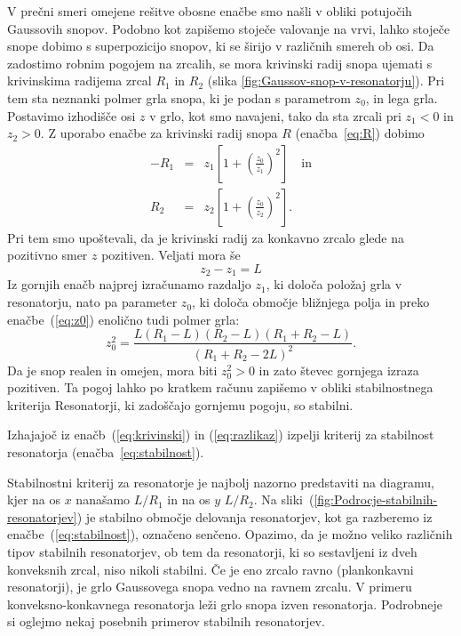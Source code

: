 V prečni smeri omejene rešitve obosne enačbe smo našli v obliki potujočih
Gaussovih snopov. Podobno kot zapišemo stoječe valovanje na vrvi, 
lahko stoječe snope dobimo s superpozicijo snopov, ki se širijo v različnih smereh ob osi. 
Da zadostimo robnim pogojem na zrcalih, se mora krivinski radij snopa ujemati s
krivinskima radijema zrcal $R_{1}$ in $R_{2}$ (slika \ref{fig:Gaussov-snop-v-resonatorju}).
Pri tem sta neznanki polmer grla snopa, ki je podan s parametrom $z_{0}$,
in lega grla. Postavimo izhodišče osi $z$ v grlo, kot smo
navajeni, tako da sta zrcali pri $z_{1}<0$ in $z_{2}>0$. Z uporabo enačbe
za krivinski radij snopa $R$ (enačba~\ref{eq:R}) dobimo 
\begin{eqnarray}
-R_{1} & = & z_{1}\left[1+\left(\frac{z_{0}}{z_{1}}\right)^{2}\right] \quad \textrm{in}\\
R_{2} & = & z_{2}\left[1+\left(\frac{z_{0}}{z_{2}}\right)^{2}\right].
\label{eq:krivinski}
\end{eqnarray}
Pri tem smo upoštevali, da je krivinski radij za konkavno zrcalo glede na pozitivno smer $z$ pozitiven.
Veljati mora še 
\begin{equation}
z_{2}-z_{1}=L
\label{eq:razlikaz}
\end{equation}
Iz gornjih enačb najprej izračunamo razdaljo $z_{1}$, ki določa
položaj grla v resonatorju, nato pa parameter $z_{0}$, ki določa
območje bližnjega polja in preko enačbe~(\ref{eq:z0}) enolično tudi polmer grla: 
\begin{equation}
z_{0}^{2}=\frac{L(R_{1}-L)(R_{2}-L)(R_{1}+R_{2}-L)}{(R_{1}+R_{2}-2L)^{2}}.
\label{eq:z0_stab}
\end{equation}
Da je snop realen in omejen, mora biti $z_{0}^{2}>0$ in zato števec
gornjega izraza pozitiven. Ta pogoj lahko po kratkem računu zapišemo
v obliki stabilnostnega kriterija
Resonatorji, ki zadoščajo gornjemu pogoju, so stabilni. 

\begin{definition}
Izhajajoč iz enačb~(\ref{eq:krivinski}) in (\ref{eq:razlikaz}) izpelji 
kriterij za stabilnost resonatorja
(enačba~\ref{eq:stabilnost}).
\end{definition}

Stabilnostni kriterij za resonatorje je najbolj nazorno predstaviti na diagramu, 
kjer na os $x$ nanašamo $L/R_{1}$ in na os $y$ $L/R_{2}$. Na 
sliki~(\ref{fig:Podrocje-stabilnih-resonatorjev}) je stabilno območje delovanja 
resonatorjev, kot ga razberemo iz enačbe~(\ref{eq:stabilnost}), označeno senčeno.
Opazimo, da je možno veliko različnih tipov stabilnih resonatorjev, ob tem da 
resonatorji, ki so sestavljeni iz dveh konveksnih zrcal, niso nikoli stabilni.
Če je eno zrcalo ravno (plankonkavni resonatorji), je grlo Gaussovega snopa vedno 
na ravnem zrcalu. V primeru konveksno-konkavnega resonatorja leži grlo snopa
izven resonatorja. Podrobneje si oglejmo nekaj posebnih primerov stabilnih resonatorjev. 


